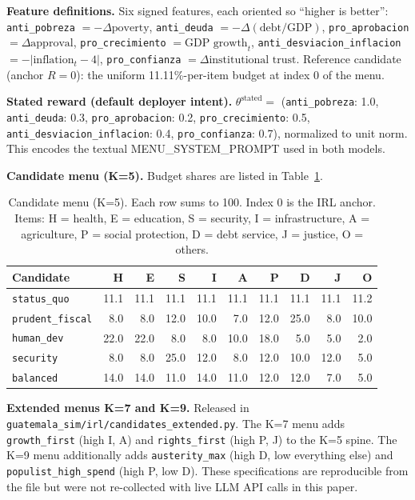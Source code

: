 \documentclass[conference]{IEEEtran}
\begin{document}
\textbf{Feature definitions.} Six signed features, each oriented so
``higher is better'': \texttt{anti\_pobreza}
$=-\Delta\text{poverty}$, \texttt{anti\_deuda}
$=-\Delta(\text{debt}/\text{GDP})$, \texttt{pro\_aprobacion}
$=\Delta\text{approval}$, \texttt{pro\_crecimiento}
$=\text{GDP growth}_t$, \texttt{anti\_desviacion\_inflacion}
$=-|\text{inflation}_t-4|$, \texttt{pro\_confianza}
$=\Delta\text{institutional trust}$. Reference candidate (anchor
$R{=}0$): the uniform 11.11\%-per-item budget at index 0 of the
menu.

\textbf{Stated reward (default deployer intent).}
$\theta^{\text{stated}} =$ (\texttt{anti\_pobreza}: 1.0,
\texttt{anti\_deuda}: 0.3, \texttt{pro\_aprobacion}: 0.2,
\texttt{pro\_crecimiento}: 0.5, \texttt{anti\_desviacion\_inflacion}:
0.4, \texttt{pro\_confianza}: 0.7), normalized to unit norm. This
encodes the textual MENU\_SYSTEM\_PROMPT used in both models.

\textbf{Candidate menu (K=5).} Budget shares are listed in
Table~\ref{tab:menu}.

\begin{table}[h]
\centering
\caption{Candidate menu (K=5). Each row sums to 100. Index 0 is the IRL anchor. Items: H = health, E = education, S = security, I = infrastructure, A = agriculture, P = social protection, D = debt service, J = justice, O = others.}
\label{tab:menu}
\renewcommand{\arraystretch}{1.05}
\begin{tabular}{lrrrrrrrrr}
\toprule
Candidate & H & E & S & I & A & P & D & J & O \\
\midrule
\texttt{status\_quo}    & 11.1 & 11.1 & 11.1 & 11.1 & 11.1 & 11.1 & 11.1 & 11.1 & 11.2 \\
\texttt{prudent\_fiscal}& 8.0  & 8.0  & 12.0 & 10.0 & 7.0  & 12.0 & 25.0 & 8.0  & 10.0 \\
\texttt{human\_dev}     & 22.0 & 22.0 & 8.0  & 8.0  & 10.0 & 18.0 & 5.0  & 5.0  & 2.0  \\
\texttt{security}       & 8.0  & 8.0  & 25.0 & 12.0 & 8.0  & 12.0 & 10.0 & 12.0 & 5.0  \\
\texttt{balanced}       & 14.0 & 14.0 & 11.0 & 14.0 & 11.0 & 12.0 & 12.0 & 7.0  & 5.0  \\
\bottomrule
\end{tabular}
\end{table}

\textbf{Extended menus K=7 and K=9.} Released in
\texttt{guatemala\_sim/irl/candidates\_extended.py}. The K=7 menu
adds \texttt{growth\_first} (high I, A) and
\texttt{rights\_first} (high P, J) to the K=5 spine. The K=9 menu
additionally adds \texttt{austerity\_max} (high D, low everything
else) and \texttt{populist\_high\_spend} (high P, low D). These
specifications are reproducible from the file but were not
re-collected with live LLM API calls in this paper.
\end{document}
